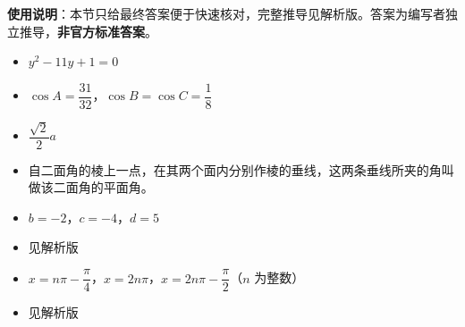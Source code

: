 
\begin{gknotice}
\textbf{使用说明}：本节只给最终答案便于快速核对，完整推导见解析版。答案为编写者独立推导，\textbf{非官方标准答案}。
\end{gknotice}

\begin{itemize}[leftmargin=2.6em]
  \item[\textbf{1.}] $y^2-11y+1=0$
  \item[\textbf{2.}] $\cos A=\dfrac{31}{32}$，$\cos B=\cos C=\dfrac18$
  \item[\textbf{3.}] $\dfrac{\sqrt2}{2}a$
  \item[\textbf{4.}] 自二面角的棱上一点，在其两个面内分别作棱的垂线，这两条垂线所夹的角叫做该二面角的平面角。
\end{itemize}

\begin{itemize}[leftmargin=2.6em]
  \item[\textbf{5.}] $b=-2$，$c=-4$，$d=5$
  \item[\textbf{6.}] 见解析版
  \item[\textbf{7.}] $x=n\pi-\dfrac\pi4$，$x=2n\pi$，$x=2n\pi-\dfrac\pi2$（$n$ 为整数）
  \item[\textbf{8.}] 见解析版
\end{itemize}

